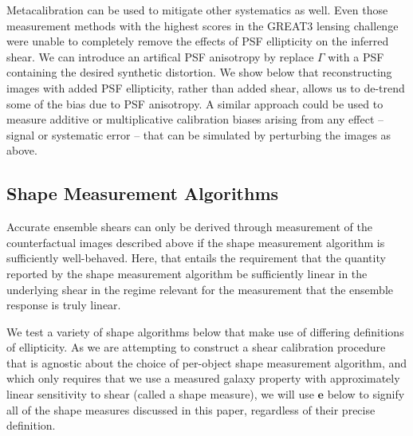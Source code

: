 \documentclass[iop]{emulateapj}
\newcommand\rmcomment[1]{\textcolor{red}{(RM: #1)}}
\begin{document}
Metacalibration can be used to mitigate other systematics as
well. Even those measurement methods with the highest scores in the
GREAT3 lensing challenge were unable to completely remove the effects
of PSF ellipticity on the inferred shear. We can introduce an
artifical PSF anisotropy by replace $\Gamma$ with a PSF containing the
desired synthetic distortion.  We show below that reconstructing
images with added PSF ellipticity, rather than added shear, allows us
to de-trend some of the bias due to PSF anisotropy. A similar approach
could be used to measure additive or multiplicative calibration biases
arising from any effect -- signal or systematic error -- that can be
simulated by perturbing the images as above.


\subsection{Shape Measurement Algorithms}
\label{subsec:shapemeas}
Accurate ensemble shears can only be derived through measurement of
the counterfactual images described above if the shape measurement
algorithm is sufficiently well-behaved. Here, that entails the
requirement that the quantity reported by the shape measurement
algorithm be sufficiently linear in the underlying shear in the regime
relevant for the measurement that the ensemble response is truly
linear.


We test a variety of shape algorithms below that make use of differing
definitions of ellipticity. As we are attempting to construct a shear
calibration procedure that is agnostic about the choice of per-object
shape measurement algorithm, and which only requires that we use a
measured galaxy property with approximately linear sensitivity to
shear (called a shape measure), we will use $\mathbf{e}$ below to
signify all of the shape measures discussed in this paper, regardless
of their precise definition.
\end{document}
